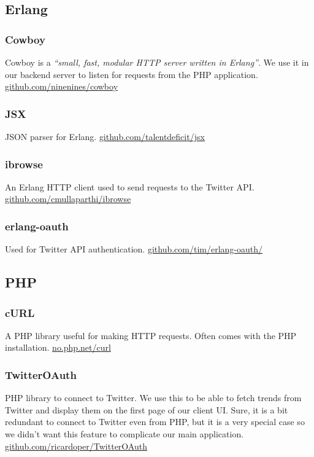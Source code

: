 \subsection{Erlang}
\subsubsection{Cowboy}
Cowboy is a \textit{``small, fast, modular HTTP server written in Erlang''}. We
use it in our backend server to listen for requests from the PHP application.
\newline
\href{https://github.com/ninenines/cowboy}{github.com/ninenines/cowboy}
\subsubsection{JSX}
JSON parser for Erlang. \newline
\href{https://github.com/talentdeficit/jsx}{github.com/talentdeficit/jsx}
\subsubsection{ibrowse}
An Erlang HTTP client used to send requests to the Twitter API. \newline
\href{https://github.com/cmullaparthi/ibrowse}{github.com/cmullaparthi/ibrowse}
\subsubsection{erlang-oauth}
Used for Twitter API authentication. \newline
\href{https://github.com/tim/erlang-oauth/}{github.com/tim/erlang-oauth/}

\subsection{PHP}
\subsubsection{cURL}
A PHP library useful for making HTTP requests. Often comes with the PHP
installation. \newline
\href{http://no.php.net/curl}{no.php.net/curl}
\subsubsection{TwitterOAuth}
PHP library to connect to Twitter. We use this to be able to fetch trends from
Twitter and display them on the first page of our client UI. Sure, it is a bit
redundant to connect to Twitter even from PHP, but it is a very special case so
we didn't want this feature to complicate our main application. \newline
\href{https://github.com/ricardoper/TwitterOAuth}
   {github.com/ricardoper/TwitterOAuth}
